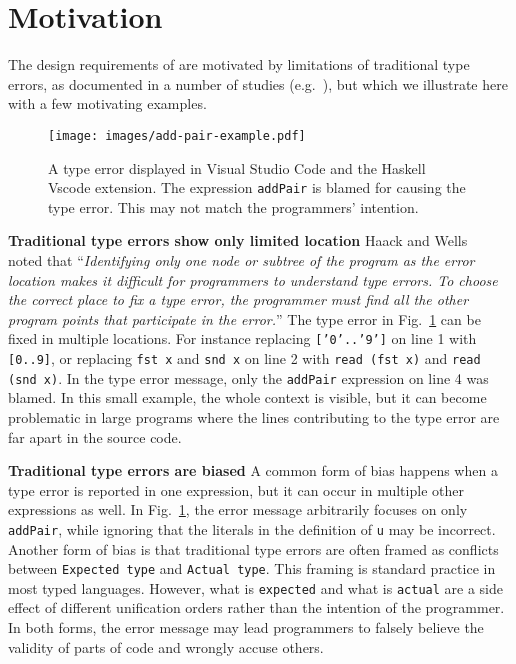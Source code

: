 
\section{Motivation}
The design requirements of \chameleon{} are motivated by limitations of traditional type errors, as documented in a number of studies (e.g.~\cite{Yang2000-wn, Hage2020-hg}), but which we illustrate here with a few motivating examples. 

\begin{figure}
    \centering
    \texttt{[image: images/add-pair-example.pdf]}
    \caption{
    A type error displayed in Visual Studio Code\cite{Microsoft_undated-hs} and the Haskell Vscode extension\cite{noauthor_2023-ot}.
The expression \texttt{addPair} is blamed for causing the type error. This may not match the programmers' intention. 
    }
    \label{fig:motivation-example}
\end{figure}

\textbf{Traditional type errors show only limited location}
Haack and Wells~\cite{Haack2004-fr} noted that ``\textit{Identifying only one node or subtree of the program as the error location makes it difficult for programmers to understand type errors. To choose the correct place to fix a type error, the programmer must find all the other program points that participate in the error.}'' The type error in Fig.~\ref{fig:motivation-example} can be fixed in multiple locations. For instance  replacing \texttt{['0'..'9']} on line 1 with \texttt{[0..9]}, or replacing \texttt{fst x} and \texttt{snd x} on line 2 with \texttt {read (fst x)} and \texttt{read (snd  x)}. In the type error message, only the \texttt{addPair} expression on line 4 was blamed.  In this small example, the whole context is visible, but it can become problematic in large programs where the lines contributing to the type error are far apart in the source code.

\textbf{Traditional type errors are biased}
A common form of bias happens when a type error is reported in one expression, but it can occur in multiple other expressions as well. In Fig.~\ref{fig:motivation-example}, the error message arbitrarily focuses on only \texttt{addPair}, while ignoring that the literals in the definition of \texttt{u} may be incorrect. %
Another form of bias is that traditional type errors are often framed as conflicts between \texttt{Expected type} and \texttt{Actual type}. This framing is standard practice in most typed languages. However, what is \texttt{expected} and what is \texttt{actual} are a side effect of different unification orders rather than the intention of the programmer. In both forms, the error message may lead programmers to falsely believe the validity of parts of code and wrongly accuse others.


